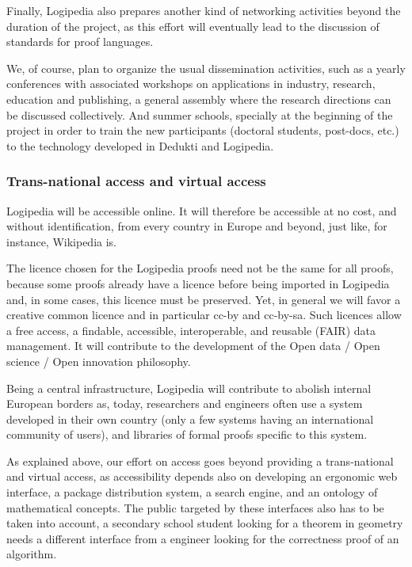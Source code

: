 Finally, Logipedia also prepares another kind of networking activities
beyond the duration of the project, as this effort will eventually
lead to the discussion of standards for proof languages.

We, of course, plan to organize the usual dissemination activities,
such as a yearly conferences with associated workshops on applications
in industry, research, education and publishing, a general assembly
where the research directions can be discussed collectively. And
summer schools, specially at the beginning of the project in order to
train the new participants (doctoral students, post-docs, etc.) to the
technology developed in Dedukti and Logipedia.


\subsubsection*{Trans-national access and virtual access}

Logipedia will be accessible online. It will therefore be accessible
at no cost, and without identification, from every country in Europe
and beyond, just like, for instance, Wikipedia is. 

The licence chosen for the Logipedia proofs need not be the same for
all proofs, because some proofs already have a licence before being
imported in Logipedia and, in some cases, this licence must be
preserved.  Yet, in general we will favor a creative common licence
and in particular cc-by and cc-by-sa.  Such licences allow a free
access, a findable, accessible, interoperable, and reusable (FAIR)
data management. It will contribute to the development of the Open
data / Open science / Open innovation philosophy.

Being a central infrastructure, Logipedia will contribute to abolish
internal European borders as, today, researchers and engineers often
use a system developed in their own country (only a few systems having
an international community of users), and libraries of formal proofs
specific to this system.

As explained above, our effort on access goes beyond providing a
trans-national and virtual access, as accessibility depends also on
developing an ergonomic web interface, a package distribution system,
a search engine, and an ontology of mathematical concepts. The public
targeted by these interfaces also has to be taken into account, a
secondary school student looking for a theorem in geometry needs a
different interface from a engineer looking for the correctness proof
of an algorithm.

